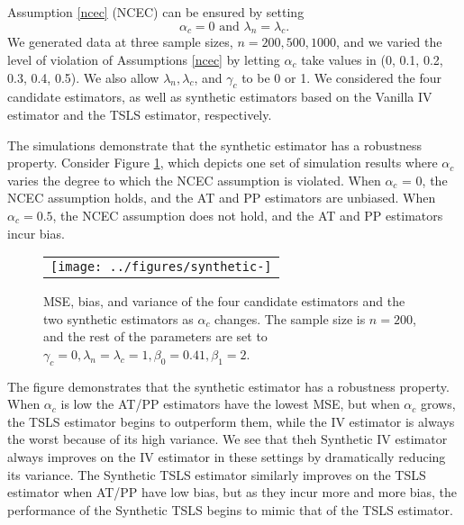 \documentclass{article}
\begin{document}
Assumption \ref{ncec} (NCEC)  can be ensured by setting \[
\alpha_c = 0 \text{ and } \lambda_n = \lambda_c.
\]
We generated data at three sample sizes, $n = 200, 500, 1000$, and we varied the level of violation of Assumptions \ref{ncec} by letting $\alpha_c$ take values in (0, 0.1, 0.2, 0.3, 0.4, 0.5).  We also allow $\lambda_n, \lambda_c$, and $\gamma_c$ to be 0 or 1. We considered the four candidate estimators, as well as synthetic estimators based on the Vanilla IV estimator and the TSLS estimator, respectively. 

The simulations demonstrate that the synthetic estimator has a robustness property. Consider Figure \ref{mse_plot_1}, which depicts one set of simulation results where $\alpha_c$ varies the degree to which the NCEC assumption is violated. When $\alpha_c$ = 0, the NCEC assumption holds, and the AT and PP estimators are unbiased. When $\alpha_c = 0.5$, the NCEC assumption does not hold, and the AT and PP estimators incur bias. 
%
\begin{figure}
\centering
\begin{tabular}{c}
\texttt{[image: ../figures/synthetic-]}
\end{tabular}\vspace{0.2in}
\caption{MSE, bias, and variance of the four candidate estimators and the two synthetic estimators as $\alpha_c$ changes. The sample size is $n = 200$, and the rest of the parameters are set to $\gamma_c = 0, \lambda_n = \lambda_c = 1, \beta_0 = 0.41, \beta_1 = 2$.}\label{mse_plot_1}
\end{figure}
%
The figure demonstrates that the synthetic estimator has a robustness property. When $\alpha_c$ is low the AT/PP estimators have the lowest MSE, but when $\alpha_c$ grows, the TSLS estimator begins to outperform them, while the IV estimator is always the worst because of its high variance. We see that theh Synthetic IV estimator always improves on the IV estimator in these settings by dramatically reducing its variance. The Synthetic TSLS estimator similarly improves on the TSLS estimator when AT/PP have low bias, but as they incur more and more bias, the performance of the Synthetic TSLS begins to mimic that of the TSLS estimator. 
\end{document}
